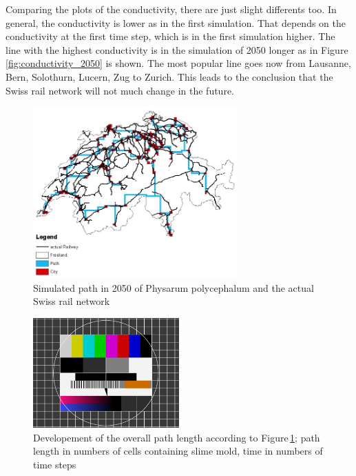\documentclass[11pt]{scrartcl}
\begin{document}
Comparing the plots of the conductivity, there are just slight differents too. In general, the conductivity is lower as in the first simulation. That depends on the conductivity at the first time step, which is in the first simulation higher. The line with the highest conductivity is in the simulation of 2050 longer as in Figure\,\ref{fig:conductivity_2050} is shown. The most popular line goes now from Lausanne, Bern, Solothurn, Lucern, Zug to Zurich. This leads to the conclusion that the Swiss rail network will not much change in the future.

\begin{figure}[H]
	\centering
	\includegraphics[width=0.7\textwidth]{figures/path_railway_2050}
	\caption{Simulated path in 2050 of Physarum polycephalum and the actual Swiss rail network}
	\label{fig:path_2050}
\end{figure}

\begin{figure}[H]
	\centering
	\includegraphics[width=0.5\textwidth]{figures/test}
	\caption{Developement of the overall path length according to Figure\,\ref{fig:path_2050}; path length in numbers of cells containing slime mold, time in numbers of time steps}
	\label{fig:plottrail_2050}
\end{figure}
\end{document}
